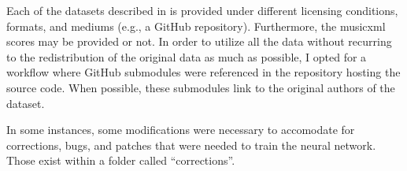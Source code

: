 
Each of the datasets described in
 is provided under
different licensing conditions, formats, and mediums (e.g.,
a GitHub repository). Furthermore, the \gls{musicxml} scores
may be provided or not. In order to utilize all the data
without recurring to the redistribution of the original data
as much as possible, I opted for a workflow where GitHub
submodules were referenced in the repository hosting the
source code. When possible, these submodules link to the
original authors of the dataset.

In some instances, some modifications were necessary to
accomodate for corrections, bugs, and patches that were
needed to train the neural network. Those exist within a
folder called ``corrections''.
